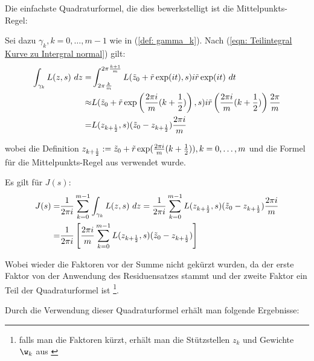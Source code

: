 \documentclass[a4paper,12pt]{report}
\newcommand{\zitat}[1]{\glqq #1\grqq}
\newcommand{\klammer}[1]{\left(#1\right)}
\newcommand{\1}{\mathds{1}}
\theoremstyle{plain} %
\theoremstyle{definition} %
\theoremstyle{remark}
\begin{document}
            Die einfachste Quadraturformel, die dies bewerkstelligt ist die \zitat{Mittelpunkts-Regel}\cite[S. 526]{numerikHermann}:

            Sei dazu $\gamma_k, k=0,\dots,m-1$ wie in (\ref{def: gamma_k}). Nach (\ref{eqn: Teilintegral Kurve zu Intergral normal}) gilt:
            \begin{align*}
                  \int_{\gamma_k} L(z, s)\ dz =& \int_{2\pi \frac{k}{m}}^{2\pi\frac{k+1}{m}}L(\Tilde z_0+\Tilde r\exp(it), s)i\Tilde r \exp(it)\ dt\\
                  \approx& L(\Tilde z_0+\Tilde r\exp\klammer{\frac{2\pi i}{m}(k+\frac{1}{2})}, s)i\Tilde r \klammer{\frac{2\pi i}{m}(k+\frac{1}{2})} \frac{2\pi}{m}\\
                  =& L(z_{k+\frac{1}{2}}, s)(\Tilde z_0-z_{k+\frac{1}{2}}) \frac{2\pi i}{m}
            \end{align*}

            wobei die Definition $z_{k+\frac{1}{2}}:= \Tilde z_0+\Tilde r\exp(\frac{2\pi i}{m}(k+\frac{1}{2})), k=0,\dots,m$
            und die Formel für die Mittelpunkts-Regel aus \cite[S. 526]{numerikHermann} verwendet wurde.

            Es gilt für $J(s)$:
            \begin{align}
                  J(s) =& \frac{1}{2\pi i}\sum_{k=0}^{m-1} \int_{\gamma_k} L(z, s)\ dz = \frac{1}{2\pi i}\sum_{k=0}^{m-1} L(z_{k+\frac{1}{2}}, s)(\Tilde z_0-z_{k+\frac{1}{2}}) \frac{2\pi i}{m}\nonumber\\
                  =&  \frac{1}{2\pi i}\left[\frac{2\pi i}{m}\sum_{k=0}^{m-1} L(z_{k+\frac{1}{2}}, s)(\Tilde z_0-z_{k+\frac{1}{2}})\right]\label{def: Mittelpunkts-Regel, angewendet}
            \end{align}

            Wobei wieder die Faktoren vor der Summe nicht gekürzt wurden, da der erste Faktor von der Anwendung des Residuensatzes stammt
            und der zweite Faktor ein Teil der Quadraturformel ist
            \footnote{falls man die Faktoren kürzt, erhält man die Stützstellen $z_k$ und Gewichte $\w_k$ aus \cite[S. 128]{grundlageFutamura}}.

            Durch die Verwendung dieser Quadraturformel erhält man folgende Ergebnisse:
\end{document}
